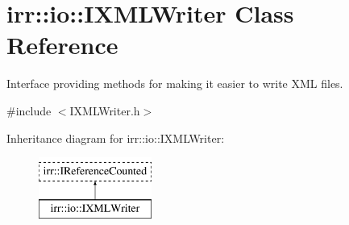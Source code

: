 \hypertarget{classirr_1_1io_1_1IXMLWriter}{}\section{irr\+:\+:io\+:\+:I\+X\+M\+L\+Writer Class Reference}
\label{classirr_1_1io_1_1IXMLWriter}


Interface providing methods for making it easier to write X\+ML files.  




{\ttfamily \#include $<$I\+X\+M\+L\+Writer.\+h$>$}

Inheritance diagram for irr\+:\+:io\+:\+:I\+X\+M\+L\+Writer\+:\begin{figure}[H]
\begin{center}
\leavevmode
\includegraphics[height=2.000000cm]{classirr_1_1io_1_1IXMLWriter}
\end{center}
\end{figure}
